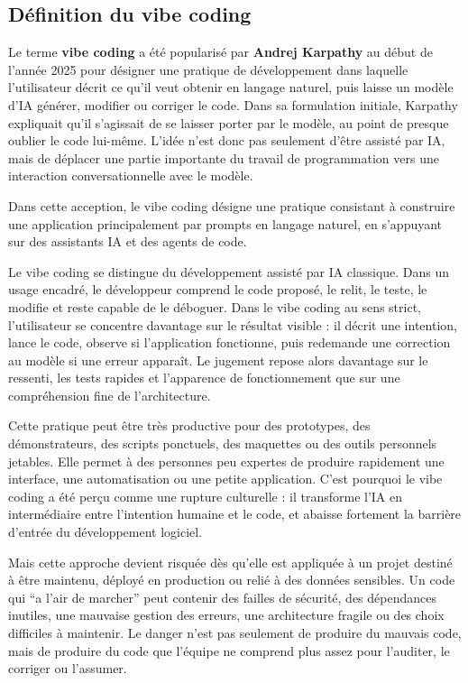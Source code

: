 \documentclass[
  10pt,
  a4paper,
  DIV=11,
  numbers=noendperiod,
  oneside]{scrreprt}
\let\oldtextbf\textbf
\renewcommand{\textbf}[1]{\oldtextbf{\textcolor{cmmnavy}{#1}}}
\begin{document}
\subsection{Définition du vibe
coding}\label{duxe9finition-du-vibe-coding}

Le terme \textbf{vibe coding} a été popularisé par \textbf{Andrej
Karpathy} au début de l'année 2025 pour désigner une pratique de
développement dans laquelle l'utilisateur décrit ce qu'il veut obtenir
en langage naturel, puis laisse un modèle d'IA générer, modifier ou
corriger le code. Dans sa formulation initiale, Karpathy expliquait
qu'il s'agissait de se laisser porter par le modèle, au point de presque
oublier le code lui-même. L'idée n'est donc pas seulement d'être assisté
par IA, mais de déplacer une partie importante du travail de
programmation vers une interaction conversationnelle avec le modèle.

Dans cette acception, le vibe coding désigne une pratique consistant à
construire une application principalement par prompts en langage
naturel, en s'appuyant sur des assistants IA et des agents de code.

Le vibe coding se distingue du développement assisté par IA classique.
Dans un usage encadré, le développeur comprend le code proposé, le
relit, le teste, le modifie et reste capable de le déboguer. Dans le
vibe coding au sens strict, l'utilisateur se concentre davantage sur le
résultat visible : il décrit une intention, lance le code, observe si
l'application fonctionne, puis redemande une correction au modèle si une
erreur apparaît. Le jugement repose alors davantage sur le ressenti, les
tests rapides et l'apparence de fonctionnement que sur une compréhension
fine de l'architecture.

Cette pratique peut être très productive pour des prototypes, des
démonstrateurs, des scripts ponctuels, des maquettes ou des outils
personnels jetables. Elle permet à des personnes peu expertes de
produire rapidement une interface, une automatisation ou une petite
application. C'est pourquoi le vibe coding a été perçu comme une rupture
culturelle : il transforme l'IA en intermédiaire entre l'intention
humaine et le code, et abaisse fortement la barrière d'entrée du
développement logiciel.

Mais cette approche devient risquée dès qu'elle est appliquée à un
projet destiné à être maintenu, déployé en production ou relié à des
données sensibles. Un code qui ``a l'air de marcher'' peut contenir des
failles de sécurité, des dépendances inutiles, une mauvaise gestion des
erreurs, une architecture fragile ou des choix difficiles à maintenir.
Le danger n'est pas seulement de produire du mauvais code, mais de
produire du code que l'équipe ne comprend plus assez pour l'auditer, le
corriger ou l'assumer.
\end{document}
